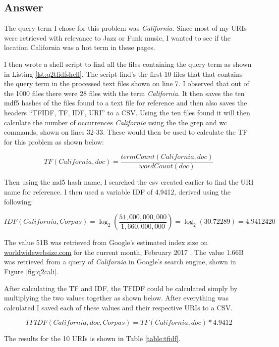 \documentclass[letterpaper,11pt]{article}
\newcommand*{\srcPath}{../src}%
\begin{document}
\subsection*{Answer}		

The query term I chose for this problem was \emph{California}. Since most of my URIs were retrieved with relevance to Jazz or Funk music, I wanted to see if the location California was a hot term in these pages. 

I then wrote a shell script to find all the files containing the query term as shown in Listing \ref{lst:q2tfidfshell}. The script find's the first 10 files that that contains the query term in the processed text files shown on line 7. I observed that out of the 1000 files there were 28 files with the term \emph{California}. It then saves the ten mdf5 hashes of the files found to a text file for reference and then also saves the headers ``TFIDF, TF, IDF, URI'' to a CSV. Using the ten files found it will then calculate the number of occurrences \emph{California} using the the grep and wc commands, shown on lines 32-33. These would then be used to calculate the TF for this problem as shown below:

\[ TF(California, doc) = \frac{termCount(California, doc)}{wordCount(doc)} \]

Then using the md5 hash name, I searched the csv created earlier to find the URI name for reference. I then used a variable IDF of 4.9412, derived using the following:

\[ IDF(California, Corpus) = \log_2 \left( \frac{51,000,000,000}{1,660,000,000} \right)  = \log_2 (30.72289) = 4.9412420\]

The value 51B was retrieved from Google's estimated index size on \url{worldwidewebsize.com} for the current month, February 2017 \cite{worldwidewebsizeref}. The value 1.66B was retrieved from a query of \emph{California} in Google's search engine, shown in Figure \ref{fig:q2cali}.

After calculating the TF and IDF, the TFIDF could be calculated simply by multiplying the two values together as shown below. After everything was calculated I saved each of these values and their respective URIs to a CSV.

\[ TFIDF(California, doc, Corpus) = TF(California, doc) * 4.9412 \]

The results for the 10 URIs is shown in Table \ref{table:tfidf}.


\end{document}
